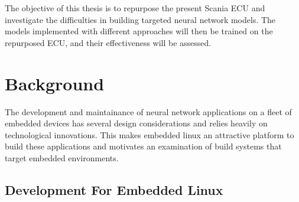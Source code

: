 The objective of this thesis is to repurpose the present Scania ECU and investigate the difficulties in building targeted neural network models. The models implemented with different approaches will then be trained on the repurposed ECU, and their effectiveness will be assessed.






\chapter{Background}

The development and maintainance of neural network applications on a fleet of embedded devices has several design considerations and relies heavily on technological innovations. This makes embedded linux an attractive platform to build these applications and motivates an examination of build systems that target embedded environments.

\section[Development Process for Embedded Linux]{Development For Embedded Linux}

